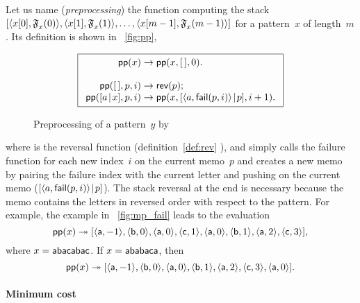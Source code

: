 Let us name  (\emph{preprocessing}) the
function computing the stack \([\langle{{x}[{0}]},{\mathfrak{F}_{x}^{}(0)}\rangle,
\langle{{x}[{1}]},{\mathfrak{F}_{x}^{}(1)}\rangle, \dots,
\langle{{x}[{m-1}]},{\mathfrak{F}_{x}^{}(m-1)}\rangle]\) for a pattern~\(x\) of
length~\(m\). Its definition is shown in \fig~\vref{fig:pp},
\begin{figure}[t]
\begin{equation*}
\boxed{%
\begin{array}{r@{\;}l@{\;}l}
\fun{pp}(x) & \rightarrow & \fun{pp}(x,\el,0).\\
\\
\fun{pp}(\el,p,i) & \rightarrow & \fun{rev}(p);\\
\fun{pp}(\cons{a}{x},p,i)
  & \rightarrow
  & \fun{pp}(x,\cons{\pair{a}{\fun{fail}(p,i)}}{p},i+1).
\end{array}}
\end{equation*}
\caption{Preprocessing of a pattern~\(y\) by 
\label{fig:pp}}
\end{figure}
where  is the reversal function
(definition~\eqref{def:rev} ), and
 simply calls the failure function
 for each new index~\(i\) on the current memo~\(p\) and
creates a new memo by pairing the failure index with the current
letter and pushing on the current memo
(\([{\langle{a},{\textsf{fail}(p,i)}\rangle}\!\mid\!{p}]\)). The stack reversal at the
end is necessary because the memo contains the letters in reversed
order with respect to the pattern. For example, the example in
\fig~\vref{fig:mp_fail} leads to the evaluation
\begin{equation*}
\textsf{pp}(x) \twoheadrightarrow
[\langle{\textsf{a}},{-1}\rangle, \langle{\textsf{b}},{0}\rangle,
\langle{\textsf{a}},{0}\rangle, \langle{\textsf{c}},{1}\rangle,
\langle{\textsf{a}},{0}\rangle, \langle{\textsf{b}},{1}\rangle,
\langle{\textsf{a}},{2}\rangle, \langle{\textsf{c}},{3}\rangle],
\end{equation*}
where \(x=\textsf{abacabac}\). If \(x=\textsf{ababaca}\), then
\begin{equation*}
\belowdisplayskip=0pt
\fun{pp}(x) \twoheadrightarrow
[\pair{\word{a}}{-1}, \pair{\word{b}}{0},
\pair{\word{a}}{0}, \pair{\word{b}}{1},
\pair{\word{a}}{2}, \pair{\word{c}}{3},
\pair{\word{a}}{0}].
\end{equation*}

\paragraph{Minimum cost} 

